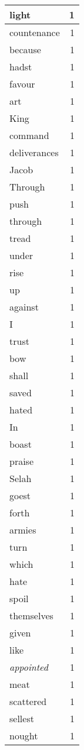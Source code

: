 \begin{center}
\begin{longtable}{l|r}
light & 1 \\ \hline
countenance & 1 \\ \hline
because & 1 \\ \hline
hadst & 1 \\ \hline
favour & 1 \\ \hline
art & 1 \\ \hline
King & 1 \\ \hline
command & 1 \\ \hline
deliverances & 1 \\ \hline
Jacob & 1 \\ \hline
Through & 1 \\ \hline
push & 1 \\ \hline
through & 1 \\ \hline
tread & 1 \\ \hline
under & 1 \\ \hline
rise & 1 \\ \hline
up & 1 \\ \hline
against & 1 \\ \hline
I & 1 \\ \hline
trust & 1 \\ \hline
bow & 1 \\ \hline
shall & 1 \\ \hline
saved & 1 \\ \hline
hated & 1 \\ \hline
In & 1 \\ \hline
boast & 1 \\ \hline
praise & 1 \\ \hline
Selah & 1 \\ \hline
goest & 1 \\ \hline
forth & 1 \\ \hline
armies & 1 \\ \hline
turn & 1 \\ \hline
which & 1 \\ \hline
hate & 1 \\ \hline
spoil & 1 \\ \hline
themselves & 1 \\ \hline
given & 1 \\ \hline
like & 1 \\ \hline
\emph{appointed} & 1 \\ \hline
meat & 1 \\ \hline
scattered & 1 \\ \hline
sellest & 1 \\ \hline
nought & 1 \\ \hline

\end{longtable}
\end{center}
